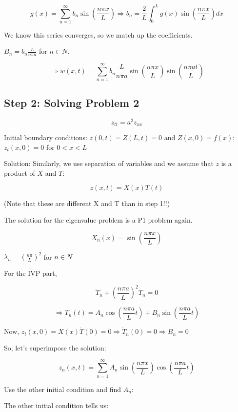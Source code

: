 $$g(x) = \sum_{n = 1}^\infty b_n \sin \left(\frac{ n \pi x}{L} \right) \Rightarrow b_n = \frac{2}{L} \int_0^L g(x) \sin \left( \frac{ n \pi x}{L} \right) dx$$

We know this series converges, so we match up the coefficients. 
\begin{center}
    $B_n = b_n \frac{L}{n \pi a}$ for $n \in N$. 
\end{center}


$$\Rightarrow w(x,t) = \sum_{n = 1}^\infty b_n \frac{L}{n \pi a} \sin \left( \frac{n \pi x}{L} \right) \sin \left( \frac{n \pi a t}{L} \right) $$

\subsection{Step 2: Solving Problem 2}

$$z_{tt} = a^2 z_{xx}$$

Initial boundary conditions: $z(0,t) = Z(L,t) = 0$ and $Z(x,0) = f(x)$; $z_t (x,0) = 0$ for $0 < x < L$

Solution: Similarly, we use separation of variables and we assume that $z$ is a product of $X$ and $T$:

$$z(x,t) = X(x) T(t)$$

(Note that these are different X and T than in step 1!!)

The solution for the eigenvalue problem is a P1 problem again. 

$$X_n(x) = \sin \left( \frac{n \pi x}{L} \right)$$
\begin{center}
    $\lambda_n = \left( \frac{n \pi}{L} \right)^2$ for $n \in N$
\end{center}


For the IVP part, 

$$\ddot{T}_n + \left( \frac{n \pi a}{L} \right)^2 T_n = 0$$

$$\Rightarrow T_n(t) = A_n \cos \left( \frac{n \pi a}{L} t \right) + B_n \sin \left( \frac{n \pi a}{L} t \right)$$

Now, $z_t(x,0) = X(x) \dot{T}(0) = 0 \Rightarrow \dot{T}_n(0) = 0 \Rightarrow B_n = 0$

So, let's superimpose the solution:

$$z_n (x,t) = \sum_{n = 1}^\infty A_n \sin \left( \frac{n \pi x}{L} \right) \cos \left( \frac{n \pi a}{L} t \right)$$

Use the other initial condition and find $A_n$:

The other initial condition tells us:

